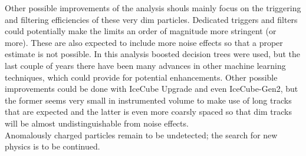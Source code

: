 \noindent Other possible improvements of the analysis shouls mainly focus on the triggering and filtering efficiencies of these very dim particles. Dedicated triggers and filters could potentially make the limits an order of magnitude more stringent (or more). These are also expected to include more noise effects so that a proper estimate is not possible. In this analysis boosted decision trees were used, but the last couple of years there have been many advances in other machine learning techniques, which could provide for potential enhancements.
Other possible improvements could be done with IceCube Upgrade and even IceCube-Gen2, but the former seems very small in instrumented volume to make use of long tracks that are expected and the latter is even more coarsly spaced so that dim tracks will be almost undistinguishable from noise effects.\\

\noindent Anomalously charged particles remain to be undetected; the search for new physics is to be continued.